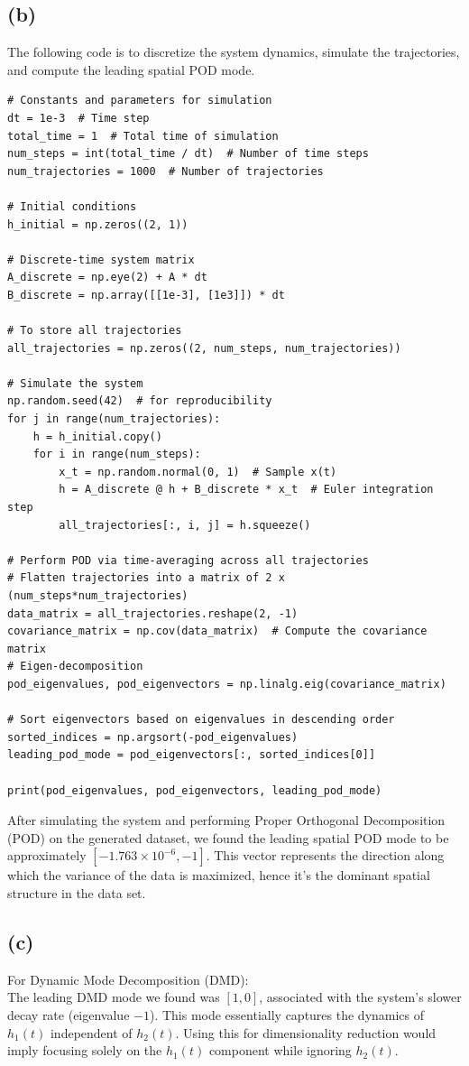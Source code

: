 \documentclass[12pt]{article}
\begin{document}
\subsection*{(b)}
The following code is to discretize the system dynamics, simulate the trajectories, and compute the leading spatial POD mode.
\begin{verbatim}
# Constants and parameters for simulation
dt = 1e-3  # Time step
total_time = 1  # Total time of simulation
num_steps = int(total_time / dt)  # Number of time steps
num_trajectories = 1000  # Number of trajectories

# Initial conditions
h_initial = np.zeros((2, 1))

# Discrete-time system matrix
A_discrete = np.eye(2) + A * dt
B_discrete = np.array([[1e-3], [1e3]]) * dt

# To store all trajectories
all_trajectories = np.zeros((2, num_steps, num_trajectories))

# Simulate the system
np.random.seed(42)  # for reproducibility
for j in range(num_trajectories):
    h = h_initial.copy()
    for i in range(num_steps):
        x_t = np.random.normal(0, 1)  # Sample x(t)
        h = A_discrete @ h + B_discrete * x_t  # Euler integration step
        all_trajectories[:, i, j] = h.squeeze()

# Perform POD via time-averaging across all trajectories
# Flatten trajectories into a matrix of 2 x (num_steps*num_trajectories)
data_matrix = all_trajectories.reshape(2, -1)  
covariance_matrix = np.cov(data_matrix)  # Compute the covariance matrix
# Eigen-decomposition
pod_eigenvalues, pod_eigenvectors = np.linalg.eig(covariance_matrix)  

# Sort eigenvectors based on eigenvalues in descending order
sorted_indices = np.argsort(-pod_eigenvalues)
leading_pod_mode = pod_eigenvectors[:, sorted_indices[0]]

print(pod_eigenvalues, pod_eigenvectors, leading_pod_mode)
\end{verbatim}
After simulating the system and performing Proper Orthogonal Decomposition (POD) on the generated dataset, we found the leading spatial POD mode to be approximately $[-1.763 \times 10^{-6},-1]$. This vector represents the direction along which the variance of the data is maximized, hence it's the dominant spatial structure in the data set.

\subsection*{(c)}
For Dynamic Mode Decomposition (DMD): \\
The leading DMD mode we found was $[1,0]$, associated with the system's slower decay rate (eigenvalue $-1$). This mode essentially captures the dynamics of $h_1(t)$ independent of $h_2(t)$. Using this for dimensionality reduction would imply focusing solely on the $h_1(t)$ component while ignoring $h_2(t)$.\\
\end{document}
